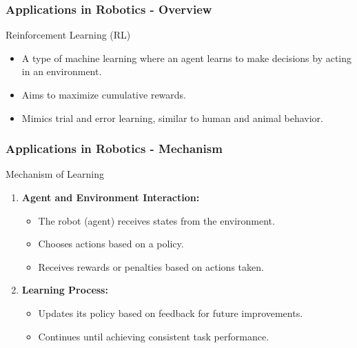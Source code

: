 \documentclass[aspectratio=169]{beamer}
\begin{document}
\begin{frame}[fragile]
    \frametitle{Applications in Robotics - Overview}
    \begin{block}{Reinforcement Learning (RL)}
        \begin{itemize}
            \item A type of machine learning where an agent learns to make decisions by acting in an environment.
            \item Aims to maximize cumulative rewards.
            \item Mimics trial and error learning, similar to human and animal behavior.
        \end{itemize}
    \end{block}
\end{frame}

\begin{frame}[fragile]
    \frametitle{Applications in Robotics - Mechanism}
    \begin{block}{Mechanism of Learning}
        \begin{enumerate}
            \item \textbf{Agent and Environment Interaction:}
                \begin{itemize}
                    \item The robot (agent) receives states from the environment.
                    \item Chooses actions based on a policy.
                    \item Receives rewards or penalties based on actions taken.
                \end{itemize}
                
            \item \textbf{Learning Process:}
                \begin{itemize}
                    \item Updates its policy based on feedback for future improvements.
                    \item Continues until achieving consistent task performance.
                \end{itemize}
        \end{enumerate}
    \end{block}
\end{frame}
\end{document}

